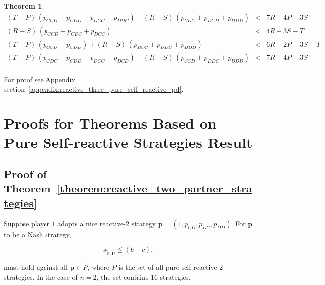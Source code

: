 \documentclass[11pt]{article}
\theoremstyle{definition}
\newtheorem{theorem}{Theorem}[section]
\begin{document}
\begin{theorem}
\begin{equation*}
\begin{array}{ccc}
    (T - P)\,(p_{CCD} + p_{CDD} + p_{DCC} + p_{DDC}) + (R - S)\,(p_{CDC} + p_{DCD} + p_{DDD}) & < & 7 R - 4 P - 3 S \\ [0.2cm]
    (R - S)\,(p_{CCD} + p_{CDC} + p_{DCC}) & < & 4 R - 3 S - T \\ [0.2cm]
    (T - P)\,(p_{CCD} + p_{CDD}) + (R - S)\,(p_{DCC} + p_{DDC} + p_{DDD}) & < & 6 R - 2 P - 3 S - T \\ [0.2cm]
    (T - P)\,(p_{CDC} + p_{CDD} + p_{DCC} + p_{DCD}) + (R - S)\,(p_{CCD} + p_{DDC} + p_{DDD}) & < & 7 R - 4 P - 3 S \\ [0.2cm]
    \end{array}
\end{equation*}
\end{theorem}

For proof see Appendix section~\ref{appendix:reactive_three_pure_self_reactive_pd}.

\appendix


\section{Proofs for Theorems Based on Pure Self-reactive Strategies Result}\label{appendix:proofs_for_theorems_pure_self_reactive}


\subsection{Proof of Theorem~\ref{theorem:reactive_two_partner_strategies}}\label{appendix:reactive_two_pure_self_reactive}

Suppose player $1$ adopts a nice reactive-2 strategy
$\mathbf{p}\!=\!(1, p_{CD}, p_{DC}, p_{DD})$. For $\mathbf{p}$ to be a Nash
strategy,

\begin{equation*}
  s_{\mathbf{\tilde{p}}, \mathbf{p}} \leq (b - c),
\end{equation*}

must hold against all \(\mathbf{\tilde{p}} \in \tilde{P}\), where \(\tilde{P}\) is the
set of all pure self-reactive-2 strategies. In the case of $n=2$, the set
contains 16 strategies.
\end{document}
